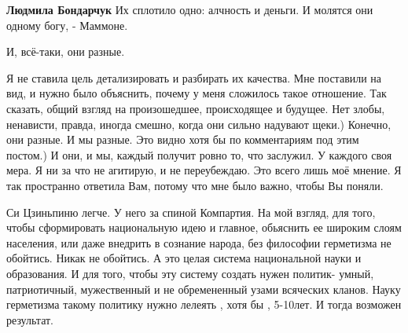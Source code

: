 \begin{itemize}
\begin{itemize}
\textbf{Людмила Бондарчук} Их сплотило одно: алчность и деньги. И молятся они одному богу, - Маммоне.

 
И, всё-таки, они разные.

 

Я не ставила цель детализировать и разбирать их качества. Мне поставили на вид,
и нужно было объяснить, почему у меня сложилось такое отношение. Так сказать,
общий взгляд на произошедшее, происходящее и будущее. Нет злобы, ненависти,
правда, иногда смешно, когда они сильно надувают щеки.) Конечно, они разные. И
мы разные. Это видно хотя бы по комментариям под этим постом.) И они, и мы,
каждый получит ровно то, что заслужил. У каждого своя мера. Я ни за что не
агитирую, и не переубеждаю. Это всего лишь моё мнение. Я так пространно
ответила Вам, потому что мне было важно, чтобы Вы поняли.

\end{itemize}

 

Си Цзиньпиню легче. У него за спиной Компартия. На мой взгляд, для того, чтобы
сформировать национальную идею и главное, обьяснить ее широким слоям населения,
или даже внедрить в сознание народа, без философии герметизма не обойтись. Никак
не обойтись. А это целая система национальной науки и образования. И для того,
чтобы эту систему создать нужен политик- умный, патриотичный, мужественный и не
обремененный узами всяческих кланов. Науку герметизма такому политику нужно
лелеять , хотя бы , 5-10лет. И тогда возможен результат.


 

\end{itemize}
